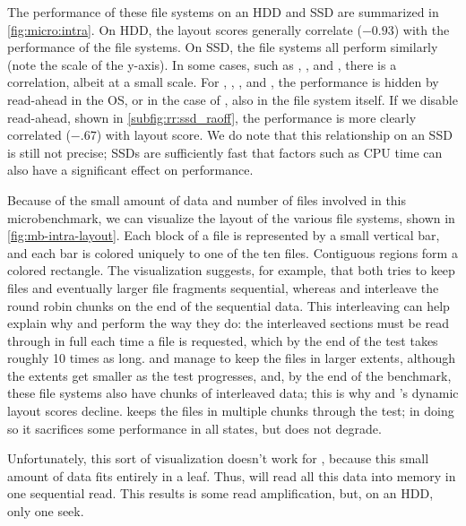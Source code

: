 

The performance of these file systems on an HDD and SSD are summarized in
\cref{fig:micro:intra}. On HDD, the layout scores generally correlate
($-0.93$) with the performance of the file systems.  On SSD, the file systems
all perform similarly (note the scale of the y-axis).  In some cases, such as
\xfs, \ext, and \zfs, there is a correlation, albeit at a small scale.  For
\btrfs, \ext, \xfs, and \ftwofs, the performance is hidden by read-ahead in the
OS, or in the case of \btrfs, also in the file system itself. If we disable
read-ahead, shown in \cref{subfig:rr:ssd_raoff}, the performance is more
clearly correlated ($-.67$) with layout score.  We do note that this
relationship on an SSD is still not precise; SSDs are sufficiently fast that
factors such as CPU time can also have a significant effect on performance.



Because of the small amount of data and number of files involved in this
microbenchmark, we can visualize the layout of the various file systems, shown
in \cref{fig:mb-intra-layout}. Each block of a file is represented by a
small vertical bar, and each bar is colored uniquely to one of the ten files.
Contiguous regions form a colored rectangle.  The visualization suggests, for
example, that \ext both tries to keep files and eventually larger file
fragments sequential, whereas \btrfs and \ftwofs interleave the round robin
chunks on the end of the sequential data. This interleaving can help explain
why \btrfs and \ftwofs perform the way they do: the interleaved sections must
be read through in full each time a file is requested, which by the end of the
test takes roughly 10 times as long. \ext and \xfs manage to keep the files in
larger extents, although the extents get smaller as the test progresses, and,
by the end of the benchmark, these file systems also have chunks of interleaved
data; this is why \ext and \xfs's  dynamic layout scores decline.  \zfs keeps
the files in multiple chunks through the test; in doing so it sacrifices some
performance in all states, but does not degrade.

Unfortunately, this sort of visualization doesn't work for \betrfs, because
this small amount of data fits entirely in a leaf.  Thus, \betrfs will read all
this data into memory in one sequential read. This results is some read
amplification, but, on an HDD, only one seek.


